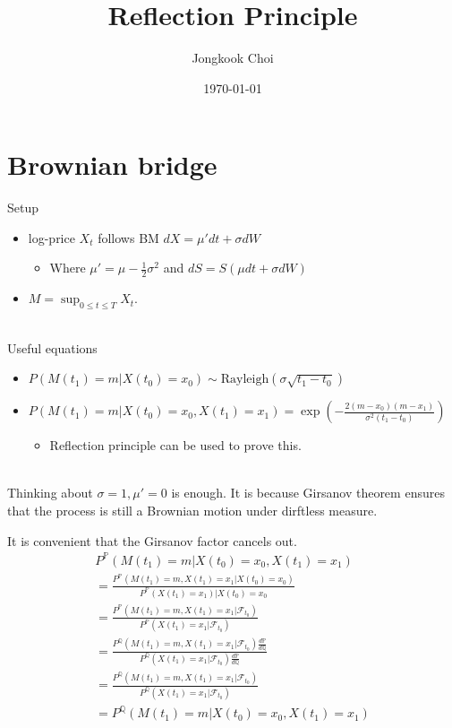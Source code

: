 \documentclass{article}
\title{Reflection Principle}
\author{Jongkook Choi}
\date{\today}
\begin{document}
\maketitle

\section{Brownian bridge}

Setup
\begin{itemize}
    \item log-price $X_t$ follows BM $dX = \mu' dt + \sigma dW$
          \begin{itemize}
              \item Where  $\mu' = \mu - \frac{1}{2} \sigma^2$ and $dS = S(\mu dt + \sigma dW)$
          \end{itemize}
    \item $M = \sup_{0 \le t \le T} X_t$.
\end{itemize}
~\\
Useful equations
\begin{itemize}
    \item $P\left(M(t_1)=m|X(t_0)=x_0\right) \sim \textrm{Rayleigh}\left(\sigma \sqrt{t_1-t_0}\right) $
    \item $P\left(M(t_1)=m|X(t_0)=x_0, X(t_1)=x_1\right) =  \exp \left( - \frac{2(m - x_0)(m - x_1)}{\sigma^2 (t_1-t_0)} \right)$
          \begin{itemize}
              \item Reflection principle can be used to prove this.
          \end{itemize}
\end{itemize}
~\\
Thinking about $\sigma = 1, \mu' = 0$ is enough.
It is because Girsanov theorem ensures that the process is still a Brownian motion under dirftless measure.

It is convenient that the Girsanov factor cancels out.
\begin{gather*}
    P^\mathbb{P}\left(M(t_1)=m|X(t_0)=x_0, X(t_1)=x_1\right) \\
    =
    \frac
    {P^\mathbb{P}\left(M(t_1)=m, X(t_1)=x_1| X(t_0)=x_0\right)}
    {P^\mathbb{P}\left(X(t_1)=x_1\right)| X(t_0)=x_0} \\
    =
    \frac
    {P^\mathbb{P}\left(M(t_1)=m, X(t_1)=x_1|\mathcal{F}_{t_0}\right)}
    {P^\mathbb{P}\left(X(t_1)=x_1|\mathcal{F}_{t_0}\right)}\\
    =
    \frac
    {P^\mathbb{Q}\left(M(t_1)=m, X(t_1)=x_1|\mathcal{F}_{t_0}\right) \frac{d\mathbb{P}}{d\mathbb{Q}}}
    {P^\mathbb{Q}\left(X(t_1)=x_1|\mathcal{F}_{t_0}\right) \frac{d\mathbb{P}}{d\mathbb{Q}}}\\
    =
    \frac
    {P^\mathbb{Q}\left(M(t_1)=m, X(t_1)=x_1|\mathcal{F}_{t_0}\right)}
    {P^\mathbb{Q}\left(X(t_1)=x_1|\mathcal{F}_{t_0}\right)}\\
    =
    P^\mathbb{Q}\left(M(t_1)=m|X(t_0)=x_0, X(t_1)=x_1\right)
\end{gather*}
\end{document}

